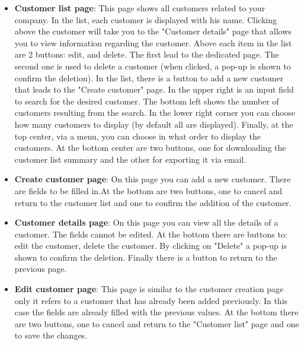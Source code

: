 \begin{itemize}
    \item \textbf{Customer list page}: This page shows all customers related to your company.
In the list, each customer is displayed with his name. Clicking above the customer will take you to the "Customer details" page that allows you to view information regarding the customer. Above each item in the list are 2 buttons: edit, and delete. The first lead to the dedicated page. The second one is used to delete a customer (when clicked, a pop-up is shown to confirm the deletion). In the list, there is a button to add a new customer that leads to the "Create customer" page.
In the upper right is an input field to search for the desired customer.
The bottom left shows the number of customers resulting from the search. In the lower right corner you can choose how many customers to display (by default all are displayed). Finally, at the top center, via a menu, you can choose in what order to display the customers.
At the bottom center are two buttons, one for downloading the customer list summary and the other for exporting it via email.
    \item \textbf{Create customer page}: On this page you can add a new customer. There are fields to be filled in.At the bottom are two buttons, one to cancel and return to the customer list and one to confirm the addition of the customer.
    \item \textbf{Customer details page}: On this page you can view all the details of a customer. The fields cannot be edited. At the bottom there are buttons to: edit the customer, delete the customer. By clicking on "Delete" a pop-up is shown to confirm the deletion. Finally there is a button to return to the previous page.
    \item \textbf{Edit customer page}: This page is similar to the customer creation page only it refers to a customer that has already been added previously. In this case the fields are already filled with the previous values. At the bottom there are two buttons, one to cancel and return to the "Customer list" page and one to save the changes.
\end{itemize}
\newpage
